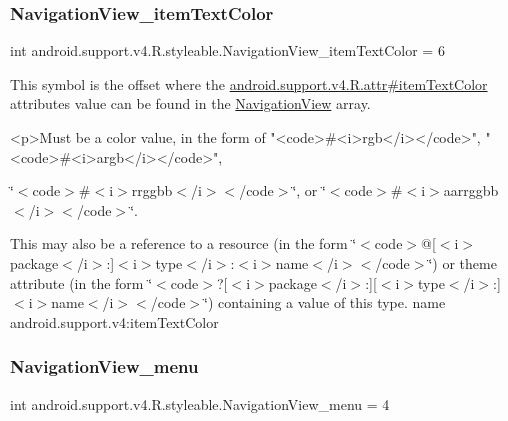 \subsubsection{\texorpdfstring{Navigation\+View\+\_\+item\+Text\+Color}{NavigationView\_itemTextColor}}
{\footnotesize\ttfamily int android.\+support.\+v4.\+R.\+styleable.\+Navigation\+View\+\_\+item\+Text\+Color = 6\hspace{0.3cm}{\ttfamily [static]}}

This symbol is the offset where the \hyperlink{classandroid_1_1support_1_1v4_1_1R_1_1attr_a4281f0a5c0d3ca403f692457be471fe7}{android.\+support.\+v4.\+R.\+attr\#item\+Text\+Color} attribute\textquotesingle{}s value can be found in the \hyperlink{classandroid_1_1support_1_1v4_1_1R_1_1styleable_a6e99b86cbaa0c61ca7598c15df537789}{Navigation\+View} array.

\begin{DoxyVerb}      <p>Must be a color value, in the form of "<code>#<i>rgb</i></code>", "<code>#<i>argb</i></code>",
\end{DoxyVerb}
 \char`\"{}$<$code$>$\#$<$i$>$rrggbb$<$/i$>$$<$/code$>$\char`\"{}, or \char`\"{}$<$code$>$\#$<$i$>$aarrggbb$<$/i$>$$<$/code$>$\char`\"{}. 

This may also be a reference to a resource (in the form \char`\"{}$<$code$>$@\mbox{[}$<$i$>$package$<$/i$>$\+:\mbox{]}$<$i$>$type$<$/i$>$\+:$<$i$>$name$<$/i$>$$<$/code$>$\char`\"{}) or theme attribute (in the form \char`\"{}$<$code$>$?\mbox{[}$<$i$>$package$<$/i$>$\+:\mbox{]}\mbox{[}$<$i$>$type$<$/i$>$\+:\mbox{]}$<$i$>$name$<$/i$>$$<$/code$>$\char`\"{}) containing a value of this type.  name android.\+support.\+v4\+:item\+Text\+Color \mbox{\label{classandroid_1_1support_1_1v4_1_1R_1_1styleable_a190d0d0a640befa4ce35b45bf2f3a67f}} 
\subsubsection{\texorpdfstring{Navigation\+View\+\_\+menu}{NavigationView\_menu}}
{\footnotesize\ttfamily int android.\+support.\+v4.\+R.\+styleable.\+Navigation\+View\+\_\+menu = 4\hspace{0.3cm}{\ttfamily [static]}}

